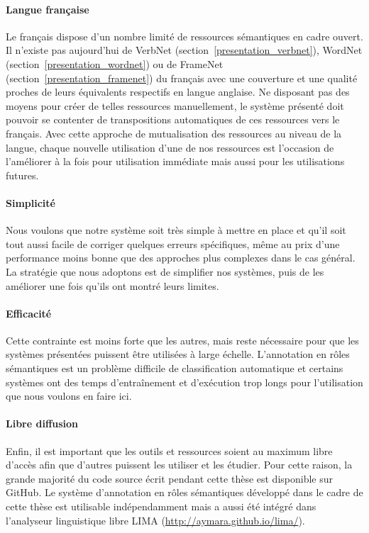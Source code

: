 \paragraph{Langue française} Le français dispose d'un nombre limité de
ressources sémantiques en cadre ouvert. Il n'existe pas aujourd'hui de VerbNet
(section~\ref{presentation_verbnet}), WordNet
(section~\ref{presentation_wordnet}) ou de FrameNet
(section~\ref{presentation_framenet}) du français avec une couverture et une
qualité proches de leurs équivalents respectifs en langue anglaise. Ne
disposant pas des moyens pour créer de telles ressources manuellement, le
système présenté doit pouvoir se contenter de transpositions automatiques de
ces ressources vers le français. Avec cette approche de mutualisation des
ressources au niveau de la langue, chaque nouvelle utilisation d'une de nos
ressources est l'occasion de l'améliorer à la fois pour utilisation immédiate
mais aussi pour les utilisations futures.

\paragraph{Simplicité} Nous voulons que notre système soit très simple à mettre
en place et qu'il soit tout aussi facile de corriger quelques erreurs
spécifiques, même au prix d'une performance moins bonne que des approches plus
complexes dans le cas général. La stratégie que nous adoptons est de simplifier
nos systèmes, puis de les améliorer une fois qu'ils ont montré leurs limites.

\paragraph{Efficacité} Cette contrainte est moins forte que les autres, mais
reste nécessaire pour que les systèmes présentées puissent être utilisées à
large échelle. L'annotation en rôles sémantiques est un problème difficile de
classification automatique et certains systèmes ont des temps d'entraînement et
d'exécution trop longs pour l'utilisation que nous voulons en faire ici.

\paragraph{Libre diffusion} Enfin, il est important que les outils et
ressources soient au maximum libre d'accès afin que d'autres puissent les
utiliser et les étudier. Pour cette raison, la grande majorité du code source
écrit pendant cette thèse est disponible sur GitHub. Le système d'annotation en
rôles sémantiques développé dans le cadre de cette thèse est utilisable
indépendamment mais a aussi été intégré dans l'analyseur linguistique libre
LIMA (\url{http://aymara.github.io/lima/}).


